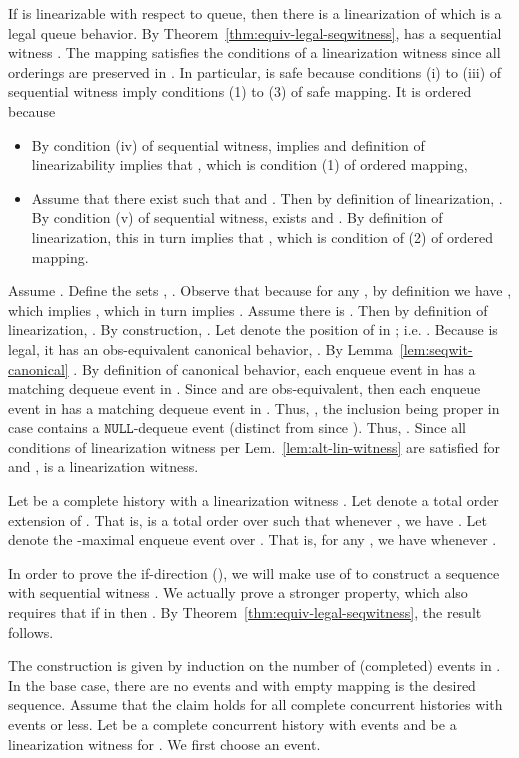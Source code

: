 \documentclass{LMCS}
\newcommand{\NULL}{\ensuremath{\mathtt{NULL}}}
\begin{document}
\noindent{\bf ()} If  is linearizable with respect to queue, then there is a linearization  of  which is a legal queue behavior.
By Theorem~\ref{thm:equiv-legal-seqwitness},  has a sequential witness .
The mapping  satisfies the conditions of a linearization witness since all  orderings are preserved in .
In particular,  is safe because conditions (i) to (iii) of sequential witness imply conditions (1) to (3) of safe mapping.
It is ordered because
\begin{itemize}
\item By condition (iv) of sequential witness,  implies  and definition of linearizability implies that , which is condition (1) of ordered mapping,
\item Assume that there exist  such that  and .
Then by definition of linearization, .
By condition (v) of sequential witness,  exists and .
By definition of linearization, this in turn implies that , which is condition of (2) of ordered mapping.
\end{itemize}
Assume .
Define the sets , .
Observe that  because for any , by definition we have , which implies , which in turn implies .
Assume there is .
Then by definition of linearization, .
By construction, .
Let  denote the position of  in ; i.e. .
Because  is legal, it has an obs-equivalent canonical behavior, .
By Lemma~\ref{lem:seqwit-canonical} .
By definition of canonical behavior, each enqueue event in  has a matching dequeue event in .
Since  and  are obs-equivalent, then each enqueue event in  has a matching dequeue event in .
Thus, , the inclusion being proper in case  contains a {\NULL}-dequeue event (distinct from  since ).
Thus, .
Since all conditions of linearization witness per Lem.~\ref{lem:alt-lin-witness} are satisfied for  and ,  is a linearization witness.

\noindent{\bf ()}
Let  be a complete history with a linearization witness .
Let  denote a total order extension of .
That is,  is a total order over  such that whenever , we have .
Let  denote the -maximal enqueue event over .
That is, for any , we have  whenever .

In order to prove the if-direction (), we will make use of  to construct a sequence  with sequential witness .
We actually prove a stronger property, which also requires that if  in  then .
By Theorem~\ref{thm:equiv-legal-seqwitness}, the result follows.

The construction is given by induction on the number of (completed) events in .
In the base case, there are no events and  with empty mapping is the desired sequence.
Assume that the claim holds for all complete concurrent histories with  events or less.
Let  be a complete concurrent history with  events and  be a linearization witness for .
We first choose an event.
\end{document}
